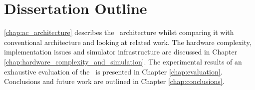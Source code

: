 \section{Dissertation Outline}

\unindentChapter \ref{chap:ac_architecture} describes the \AC\ architecture whilst comparing it with conventional architecture and looking at related work. The hardware complexity, implementation issues and simulator infrastructure are discussed in Chapter \ref{chap:hardware_complexity_and_simulation}. The experimental results of an exhaustive evaluation of the \AC\ is presented in Chapter \ref{chap:evaluation}. Conclusions and future work are outlined in Chapter \ref{chap:conclusions}.
